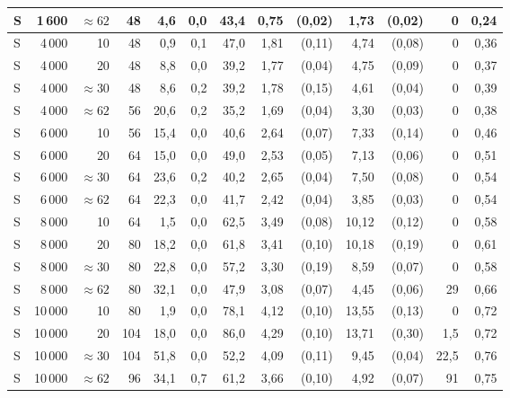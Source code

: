 \begin{landscape}
{\begin{longtable}{@{}l r r r  r r r  r r  r r  r r@{}}
S & 1\,600 & ${\approx}62$ &  48 &  4{,}6 & 0{,}0 &  43{,}4 &  0{,}75 & (0{,}02) &  1{,}73 & (0{,}02) &      0 & 0{,}24 \\
\midrule
S & 4\,000 & 10           &  48 &  0{,}9 & 0{,}1 &  47{,}0 &  1{,}81 & (0{,}11) &  4{,}74 & (0{,}08) &      0 & 0{,}36 \\
S & 4\,000 & 20           &  48 &  8{,}8 & 0{,}0 &  39{,}2 &  1{,}77 & (0{,}04) &  4{,}75 & (0{,}09) &      0 & 0{,}37 \\
S & 4\,000 & ${\approx}30$ &  48 &  8{,}6 & 0{,}2 &  39{,}2 &  1{,}78 & (0{,}15) &  4{,}61 & (0{,}04) &      0 & 0{,}39 \\
S & 4\,000 & ${\approx}62$ &  56 & 20{,}6 & 0{,}2 &  35{,}2 &  1{,}69 & (0{,}04) &  3{,}30 & (0{,}03) &      0 & 0{,}38 \\
\midrule
S & 6\,000 & 10           &  56 & 15{,}4 & 0{,}0 &  40{,}6 &  2{,}64 & (0{,}07) &  7{,}33 & (0{,}14) &      0 & 0{,}46 \\
S & 6\,000 & 20           &  64 & 15{,}0 & 0{,}0 &  49{,}0 &  2{,}53 & (0{,}05) &  7{,}13 & (0{,}06) &      0 & 0{,}51 \\
S & 6\,000 & ${\approx}30$ &  64 & 23{,}6 & 0{,}2 &  40{,}2 &  2{,}65 & (0{,}04) &  7{,}50 & (0{,}08) &      0 & 0{,}54 \\
S & 6\,000 & ${\approx}62$ &  64 & 22{,}3 & 0{,}0 &  41{,}7 &  2{,}42 & (0{,}04) &  3{,}85 & (0{,}03) &      0 & 0{,}54 \\
\midrule
S & 8\,000 & 10           &  64 &  1{,}5 & 0{,}0 &  62{,}5 &  3{,}49 & (0{,}08) & 10{,}12 & (0{,}12) &      0 & 0{,}58 \\
S & 8\,000 & 20           &  80 & 18{,}2 & 0{,}0 &  61{,}8 &  3{,}41 & (0{,}10) & 10{,}18 & (0{,}19) &      0 & 0{,}61 \\
S & 8\,000 & ${\approx}30$ &  80 & 22{,}8 & 0{,}0 &  57{,}2 &  3{,}30 & (0{,}19) &  8{,}59 & (0{,}07) &      0 & 0{,}58 \\
S & 8\,000 & ${\approx}62$ &  80 & 32{,}1 & 0{,}0 &  47{,}9 &  3{,}08 & (0{,}07) &  4{,}45 & (0{,}06) &     29 & 0{,}66 \\
\midrule
S & 10\,000 & 10           &  80 &  1{,}9 & 0{,}0 &  78{,}1 &  4{,}12 & (0{,}10) & 13{,}55 & (0{,}13) &      0 & 0{,}72 \\
S & 10\,000 & 20           & 104 & 18{,}0 & 0{,}0 &  86{,}0 &  4{,}29 & (0{,}10) & 13{,}71 & (0{,}30) &  1{,}5 & 0{,}72 \\
S & 10\,000 & ${\approx}30$ & 104 & 51{,}8 & 0{,}0 &  52{,}2 &  4{,}09 & (0{,}11) &  9{,}45 & (0{,}04) & 22{,}5 & 0{,}76 \\
S & 10\,000 & ${\approx}62$ &  96 & 34{,}1 & 0{,}7 &  61{,}2 &  3{,}66 & (0{,}10) &  4{,}92 & (0{,}07) &     91 & 0{,}75 \\
\end{longtable}
}
\end{landscape}
